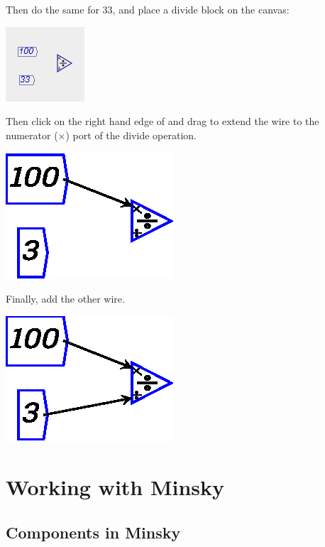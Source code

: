 Then do the same for 33, and place a divide block on the canvas:
\begin{center}
\includegraphics{images/NewItem123} 
\par\end{center}

Then click on the right hand edge of  and
drag to extend the wire to the numerator ($\times$) port of the divide
operation.
\begin{center}
\includegraphics{images/wireExample1} 
\par\end{center}

Finally, add the other wire. 
\begin{center}
\includegraphics{images/wireExample2} 
\par\end{center}

\section{Working with Minsky}

\subsection{Components in Minsky}

